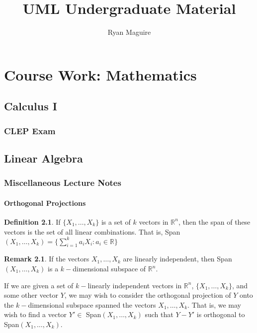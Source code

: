 \documentclass[oneside]{book}
\title{UML Undergraduate Material}
\author{Ryan Maguire}
\date{\vspace{-5ex}}
\theoremstyle{definition}
\newtheorem{definition}{Definition}[section]
\newtheorem{remark}{Remark}[section]
\begin{document}
\maketitle
\tableofcontents

\part{Course Work: Mathematics}

\chapter{Calculus I}

\section{CLEP Exam}


\chapter{Linear Algebra}

\section{Miscellaneous Lecture Notes}

\subsection{Orthogonal Projections}

\begin{definition}
If $\{X_1,\hdots, X_k\}$ is a set of $k$ vectors in $\mathbb{R}^n$, then the span of these vectors is the set of all linear combinations. That is, Span$(X_1,\hdots, X_k) = \{\sum_{i=1}^{k} a_i X_i: a_i \in \mathbb{R}\}$
\end{definition}

\begin{remark}
If the vectors $X_1,\hdots, X_k$ are linearly independent, then Span$(X_1,\hdots, X_k)$ is a $k-$dimensional subspace of $\mathbb{R}^n$.
\end{remark}

If we are given a set of $k-$linearly independent vectors in $\mathbb{R}^n$, $\{X_1,\hdots, X_k\}$, and some other vector $Y$, we may wish to consider the orthogonal projection of $Y$ onto the $k-$dimensional subspace spanned the vectors $X_1,\hdots, X_k$. That is, we may wish to find a vector $Y'\in$ Span$(X_1,\hdots, X_k)$ such that $Y-Y'$ is orthogonal to Span$(X_1,\hdots, X_k)$.
\end{document}
